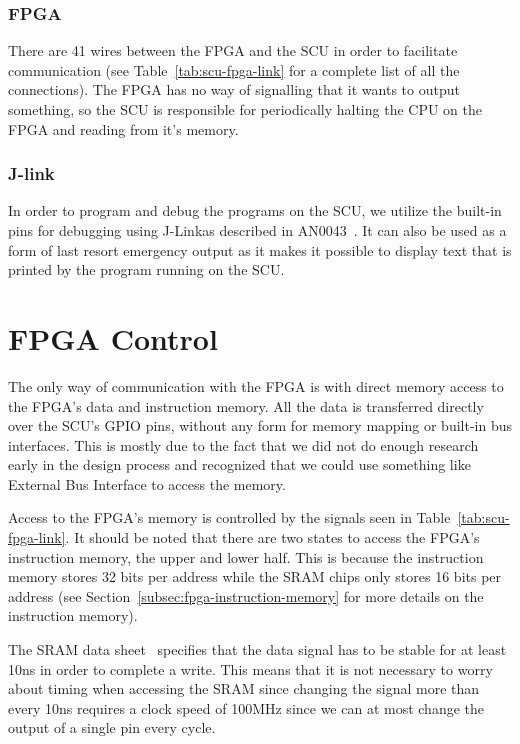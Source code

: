 \subsubsection{FPGA}
There are 41 wires between the FPGA and the SCU in order to facilitate communication (see Table~\ref{tab:scu-fpga-link} for a complete list of all the connections).
The FPGA has no way of signalling that it wants to output something, so the SCU is responsible for periodically halting the CPU on the FPGA and reading from it's memory.

\subsubsection{J-link}
In order to program and debug the programs on the SCU, we utilize the built-in pins for debugging using J-Link\texttrademark as described in AN0043~\cite{an0043}.
It can also be used as a form of last resort emergency output as it makes it possible to display text that is printed by the program running on the SCU.

\section{FPGA Control}
The only way of communication with the FPGA is with direct memory access to the FPGA's data and instruction memory.
All the data is transferred directly over the SCU's GPIO pins, without any form for memory mapping or built-in bus interfaces.
This is mostly due to the fact that we did not do enough research early in the design process and recognized that we could use something like External Bus Interface to access the memory.

Access to the FPGA's memory is controlled by the signals seen in Table~\ref{tab:scu-fpga-link}.
It should be noted that there are two states to access the FPGA's instruction memory, the upper and lower half.
This is because the instruction memory stores 32 bits per address while the SRAM chips only stores 16 bits per address (see Section~\ref{subsec:fpga-instruction-memory} for more details on the instruction memory).

The SRAM data sheet~\cite{sram-datasheet} specifies that the data signal has to be stable for at least 10ns in order to complete a write.
This means that it is not necessary to worry about timing when accessing the SRAM since changing the signal more than every 10ns requires a clock speed of 100MHz since we can at most change the output of a single pin every cycle.

